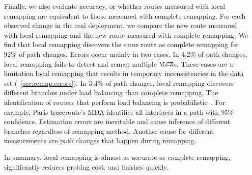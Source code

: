 

Finally, we also evaluate accuracy, or whether routes measured with
local remapping are equivalent to those measured with complete remapping.
For each observed change in the real deployment, we compare the new
route measured with local remapping and the new route measured with
complete remapping.  We find that local remapping discovers the same
route as complete remapping for 92\% of path changes.  Errors occur
mainly in two cases. In 4.2\% of path changes, local remapping fails to
detect and remap multiple $\LCZ$s. These cases are a limitation local
remapping that results in temporary inconsistencies in the data set
(\secstr~\ref{sec:remap.errors}). In 3.4\% of path changes, local
remapping discovers different branches under load balancing than
complete remapping. The identification of routers that perform load
balancing is probabilistic~\cite{veitch09balancer}.  For example, Paris
traceroute's MDA identifies all interfaces in a path with 95\%
confidence.  Estimation errors are inevitable and cause inference of
different branches regardless of remapping method.  Another cause for
different measurements are path changes that happen during remapping.


In summary, local remapping is almost as accurate as complete remapping,
significantly reduces probing cost, and finishes quickly.
